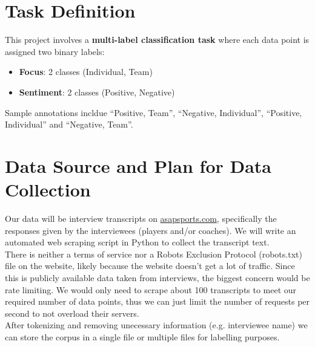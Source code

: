 \documentclass[titlepage]{article}
\begin{document}
\section{Task Definition}
This project involves a \textbf{multi-label classification task} where each data point is assigned two binary 
labels:

\begin{itemize}
  \item \textbf{Focus}: 2 classes (Individual, Team)
  \item \textbf{Sentiment}: 2 classes (Positive, Negative)
\end{itemize}

Sample annotations incldue ``Positive, Team'', ``Negative, Individual'', ``Positive, Individual'' and ``Negative, Team''.

\section{Data Source and Plan for Data Collection}
Our data will be interview transcripts on \href{https://asapsports.com/}{asapsports.com}, specifically the responses given by the interviewees 
(players and/or coaches). We will write an automated web scraping script in Python to collect the transcript text.\\

\indent There is neither a terms of service nor a Robots Exclusion Protocol (robots.txt) file on the website, likely 
because the website doesn’t get a lot of traffic. Since this is publicly available data taken from interviews, the 
biggest concern would be rate limiting. We would only need to scrape about 100 transcripts to meet our required number 
of data points, thus we can just limit the number of requests per second to not overload their servers.\\

\indent After tokenizing and removing unecessary information (e.g. interviewee name) we can store the corpus in a 
single file or multiple files for labelling purposes.
\end{document}

